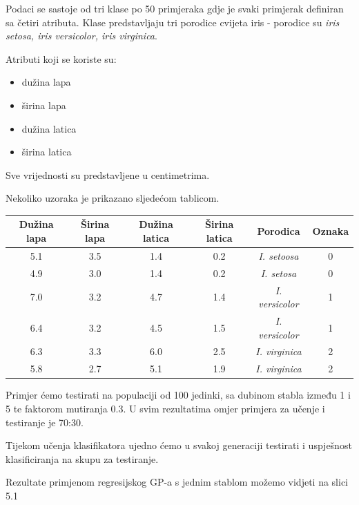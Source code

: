 \documentclass[times, utf8, zavrsni]{fer}
\begin{document}
Podaci se sastoje od tri klase po 50 primjeraka gdje je svaki primjerak definiran sa četiri atributa. Klase predstavljaju tri porodice cvijeta iris - porodice su \textit{iris setosa, iris versicolor, iris virginica}.

Atributi koji se koriste su:
\begin{itemize}
\item dužina lapa
\item širina lapa
\item dužina latica
\item širina latica
\end{itemize}

Sve vrijednosti su predstavljene u centimetrima.

Nekoliko uzoraka je prikazano sljedećom tablicom.

\begin{center}
\begin{tabular}{|c|c|c|c|c|c|}
\hline
Dužina lapa & Širina lapa & Dužina latica & Širina latica & Porodica & Oznaka \\
\hline
5.1 & 3.5 & 1.4 & 0.2 & \textit{I. setoosa} & 0 \\
\hline
4.9 & 3.0 & 1.4 & 0.2 & \textit{I. setosa} & 0\\
\hline
7.0 & 3.2 & 4.7 & 1.4 & \textit{I. versicolor} & 1\\
\hline
6.4 & 3.2 & 4.5 & 1.5 & \textit{I. versicolor} & 1\\
\hline
6.3 & 3.3 & 6.0 & 2.5 & \textit{I. virginica} & 2\\
\hline
5.8 & 2.7 & 5.1 & 1.9 & \textit{I. virginica} & 2\\
\hline
\end{tabular}
\end{center}

Primjer ćemo testirati na populaciji od 100 jedinki, sa dubinom stabla između 1 i 5 te faktorom mutiranja 0.3. U svim rezultatima omjer primjera za učenje i testiranje je 70:30. 

Tijekom učenja klasifikatora ujedno ćemo u svakoj generaciji testirati i uspješnost klasificiranja na skupu za testiranje.

Rezultate primjenom regresijskog GP-a s jednim stablom možemo vidjeti na slici 5.1
\end{document}
